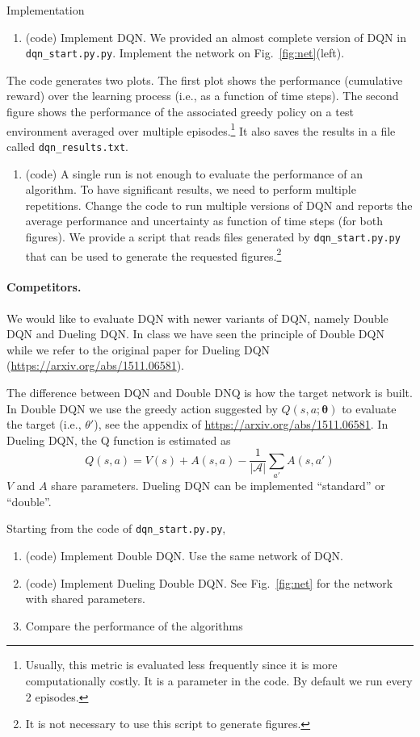 \documentclass[a4paper]{article}
\begin{document}
Implementation
\begin{enumerate}
    \item (code) Implement DQN. We provided an almost complete version of DQN in \texttt{dqn\_start.py.py}.
          Implement the network on Fig.~\ref{fig:net}(left).
\end{enumerate}
The code generates two plots. The first plot shows the performance (cumulative reward) over the learning process (i.e., as a function of time steps). The second figure shows the performance of the associated greedy policy on a test environment averaged over multiple episodes.\footnote{Usually, this metric is evaluated less frequently since it is more computationally costly. It is a parameter in the code. By default we run every 2 episodes.} It also saves the results in a file called \texttt{dqn\_results.txt}.
\begin{enumerate}
    \item (code) A single run is not enough to evaluate the performance of an algorithm. To have significant results, we need to perform multiple repetitions. Change the code to run multiple versions of DQN and reports the average performance and uncertainty as function of time steps (for both figures). We provide a script that reads files generated by \texttt{dqn\_start.py.py} that can be used to generate the requested figures.\footnote{It is not necessary to use this script to generate figures.}
\end{enumerate}

\paragraph{Competitors.} We would like to evaluate DQN with newer variants of DQN, namely Double DQN and Dueling DQN.
In class we have seen the principle of Double DQN while we refer to the original paper for Dueling DQN (\url{https://arxiv.org/abs/1511.06581}).

The difference between DQN and Double DNQ is how the target network is built. In Double DQN we use the greedy action suggested by $Q(s,a; \boldsymbol{\theta})$ to evaluate the target (i.e., $\theta'$), see the appendix of \url{https://arxiv.org/abs/1511.06581}.
In Dueling DQN, the Q function is estimated as
\[
    Q(s,a) = V(s) + A(s,a) - \frac{1}{|\mathcal{A}|} \sum_{a'} A(s,a')
\]
$V$ and $A$ share parameters.
Dueling DQN can be implemented ``standard'' or ``double''.

Starting from the code of \texttt{dqn\_start.py.py},
\begin{enumerate}
    \item (code) Implement Double DQN. Use the same network of DQN.
    \item (code) Implement Dueling Double DQN. See Fig.~\ref{fig:net} for the network with shared parameters.
    \item Compare the performance of the algorithms
\end{enumerate}
\end{document}
